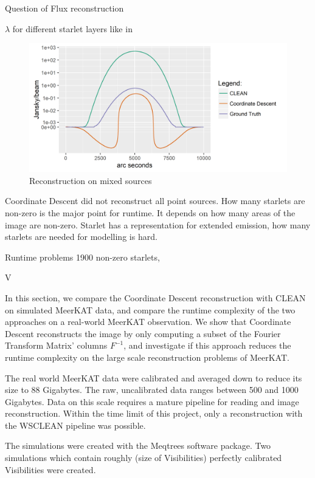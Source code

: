 Question of Flux reconstruction

 $\lambda$ for different starlet layers like in \cite{girard2015sparse}

\begin{figure}[h]
	\centering
	\includegraphics[width=0.8\linewidth]{./chapters/20.results/mixed/mixed_contour.png}
	\caption{Reconstruction on mixed sources}
	\label{results:mixed:contour}
\end{figure}

Coordinate Descent did not reconstruct all point sources. How many starlets are non-zero is the major point for runtime. It depends on how many areas of the image are non-zero. Starlet has a representation for extended emission, how many starlets are needed for modelling is hard.

Runtime problems
1900 non-zero starlets, 


V

In this section, we compare the Coordinate Descent reconstruction with CLEAN on simulated MeerKAT data, and compare the runtime complexity of the two approaches on a real-world MeerKAT observation. We show that Coordinate Descent reconstructs the image by only computing a subset of the Fourier Transform Matrix' columns $F^{-1}$, and investigate if this approach reduces the runtime complexity on the large scale reconstruction problems of MeerKAT.


The real world MeerKAT data were calibrated and averaged down to reduce its size to 88 Gigabytes. The raw, uncalibrated data ranges between 500 and 1000 Gigabytes. Data on this scale requires a mature pipeline for reading and image reconstruction. Within the time limit of this project, only a reconstruction with the WSCLEAN\cite{offringa2014wsclean} pipeline was possible.

The simulations were created with the Meqtrees software package. Two simulations which contain roughly (size of Visibilities) perfectly calibrated Visibilities were created. 

